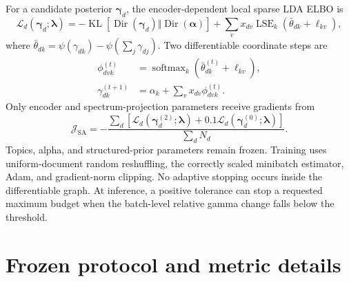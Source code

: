 \documentclass[11pt]{article}
\begin{document}
For a candidate posterior $\boldsymbol\gamma_d$, the encoder-dependent local
sparse LDA ELBO is
\begin{equation}
 \mathcal L_d(\boldsymbol\gamma_d;\boldsymbol\lambda)
 =-\operatorname{KL}\!\left[
 \operatorname{Dir}(\boldsymbol\gamma_d)\Vert
 \operatorname{Dir}(\boldsymbol\alpha)\right]
 +\sum_v x_{dv}\operatorname{LSE}_k\left(
 \bar\theta_{dk}+\ell_{kv}\right),
\end{equation}
where
$\bar\theta_{dk}=\psi(\gamma_{dk})-\psi(\sum_j\gamma_{dj})$.
Two differentiable coordinate steps are
\begin{align}
 \phi_{dvk}^{(t)}&=\operatorname{softmax}_k(
 \bar\theta_{dk}^{(t)}+\ell_{kv}),\\
 \gamma_{dk}^{(t+1)}&=\alpha_k+\sum_vx_{dv}\phi_{dvk}^{(t)}.
\end{align}
Only encoder and spectrum-projection parameters receive gradients from
\begin{equation}
 \mathcal J_{\mathrm{SA}}=-\frac{\sum_d[
 \mathcal L_d(\boldsymbol\gamma_d^{(2)};\boldsymbol\lambda)
 +0.1\mathcal L_d(\boldsymbol\gamma_d^{(0)};\boldsymbol\lambda)]}
 {\sum_dN_d}.
\end{equation}
Topics, alpha, and structured-prior parameters remain frozen. Training uses
uniform-document random reshuffling, the correctly scaled minibatch estimator,
Adam, and gradient-norm clipping. No adaptive stopping occurs inside the
differentiable graph. At inference, a positive tolerance can stop a requested
maximum budget when the batch-level relative gamma change falls below the
threshold.

\section{Frozen protocol and metric details}
\label{app:protocol}
\end{document}
